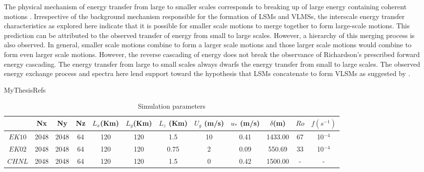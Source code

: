 The physical mechanism of energy transfer from large to smaller scales corresponds to breaking up of large energy containing coherent motions \citep[chap. 5]{davidson_turb_book}. Irrespective of the background mechanism responsible for the formation of LSMs and VLMSs, the interscale energy transfer characteristics as explored here indicate that it is possible for smaller scale motions to merge together to form large-scale motions. This prediction can be attributed to the observed transfer of energy from small to large scales. However, a hierarchy of this merging process is also observed. In general, smaller scale motions combine to form a larger scale motions and those larger scale motions would combine to form even larger scale motions. However, the reverse cascading of energy does not break the observance of Richardson's prescribed forward energy cascading. The energy transfer from large to small scales always dwarfs the energy transfer from small to large scales. The observed energy exchange process and spectra here lend support toward the hypothesis that LSMs concatenate to form VLSMs as suggested by \citet{kim_adrian_pof99, balakumar_adrian_ptrs_07, baltzer_jfm_13}.


 {MyThesisRefs}
\clearpage

\begin{table}
\centering
\footnotesize
\caption{Simulation parameters}
\centering
\begin{tabular}{ c c c c c c c c c c c c}
\hline 
 & Nx & Ny & Nz & $L_x$(Km) & $L_y$(Km) & $L_z$ (Km) & $U_g$ (m/s) & $u_*$ (m/s) & $\delta$(m) & $Ro$ & $f(s^{-1})$ \\
\hline 
$EK10$ & 2048 & 2048 & 64 & 120 & 120 & 1.5 & 10  & 0.41 & 1433.00  & 67 & 10$^{-4}$  \\
$EK02$ & 2048 & 2048 & 64 & 120 & 120 & 0.75 & 2 & 0.09 & 550.69 & 33 & 10$^{-4}$ \\
$CHNL$ & 2048 & 2048 & 64 & 120 & 120 & 1.5 & 0 & 0.42  & 1500.00 & - & - \\
\hline 
\hline 
\end{tabular}
\label{tab:sim_param}
\end{table}

